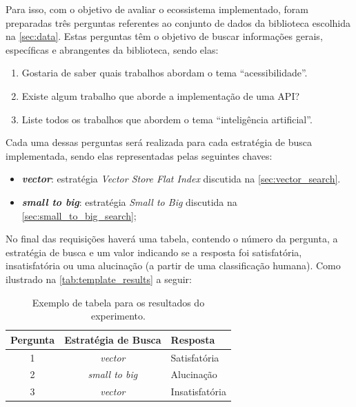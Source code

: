 \documentclass[a4paper, 12pt]{article}
\begin{document}
    Para isso, com o objetivo de avaliar o ecossistema implementado, foram preparadas três perguntas referentes ao conjunto de dados da biblioteca escolhida na \autoref{sec:data}. Estas perguntas têm o objetivo de buscar informações gerais, específicas e abrangentes da biblioteca, sendo elas:

    \begin{enumerate}
        \item Gostaria de saber quais trabalhos abordam o tema ``acessibilidade''.
        \item Existe algum trabalho que aborde a implementação de uma API?
        \item Liste todos os trabalhos que abordem o tema ``inteligência artificial''.
    \end{enumerate}

    Cada uma dessas perguntas será realizada para cada estratégia de busca implementada, sendo elas representadas pelas seguintes chaves:
    
    \begin{itemize}
        \item \textbf{\textit{vector}}: estratégia \textit{Vector Store Flat Index} discutida na \autoref{sec:vector_search}.
        \item \textbf{\textit{small to big}}: estratégia \textit{Small to Big} discutida na \autoref{sec:small_to_big_search};
    \end{itemize}
    
    No final das requisições haverá uma tabela, contendo o número da pergunta, a estratégia de busca e um valor indicando se a resposta foi satisfatória, insatisfatória ou uma alucinação (a partir de uma classificação humana). Como ilustrado na \autoref{tab:template_results} a seguir:

    \begin{center}
        \begin{table}[h!]
        \centering
        \renewcommand{\arraystretch}{1.5} %
        \setlength{\tabcolsep}{8pt} %
        \begin{tabular}{|c|c|l|}
        \hline
        \textbf{Pergunta} & \textbf{Estratégia de Busca} & \textbf{Resposta} \\ \hline
         1                & \textit{vector}              & Satisfatória      \\ \hline
         2                & \textit{small to big}        & Alucinação        \\ \hline
         3                & \textit{vector}              & Insatisfatória    \\ \hline
        \end{tabular}
        \caption{Exemplo de tabela para os resultados do experimento.}
        \label{tab:template_results}
        \end{table}
    \end{center}
\end{document}
